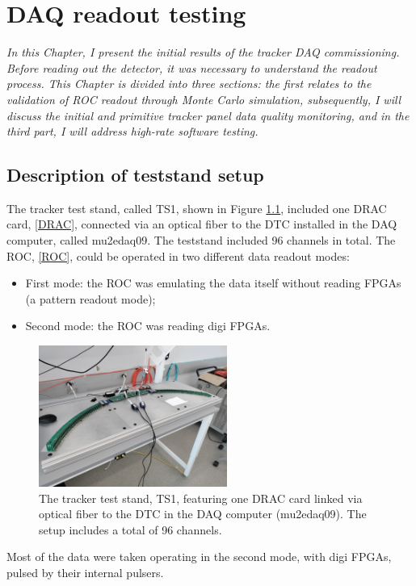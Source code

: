 \chapter{DAQ readout testing}
\textit{In this Chapter, I present the initial results of the tracker DAQ commissioning. Before reading out the detector, 
    it was necessary to understand the readout process. This Chapter is divided into three sections: the first relates 
    to the validation of ROC readout through Monte Carlo simulation, subsequently, I will discuss the initial and primitive tracker panel data quality monitoring, 
    and in the third part, I will address high-rate software testing.}
  \section{Description of teststand setup}\label{des}
    The tracker test stand,  called TS1, shown in Figure \ref{fig:TS1}, included one DRAC card, \ref{DRAC}, connected via an optical fiber
    to the DTC installed in the DAQ computer, called mu2edaq09. The teststand included 96 channels in total.
    The ROC, \ref{ROC}, could be operated in two different data readout modes:
    \begin{itemize}
    \item  First mode: the ROC was emulating the data itself without reading FPGAs (a pattern readout mode);
    \item  Second mode: the ROC was reading digi FPGAs.
    \end{itemize}
    \begin{figure}[!h]
        \centering
        \includegraphics[width =0.55\textwidth]{figures/jpg/IMG_20240219_090538.jpg}
        \caption{The tracker test stand, TS1, featuring one DRAC card linked via optical fiber to the DTC in the DAQ computer (mu2edaq09). The setup includes a total of 96 channels.}
        \label{fig:TS1}
        \end{figure}
    Most of the data were taken operating in the second mode, with digi FPGAs, pulsed by their internal pulsers.

